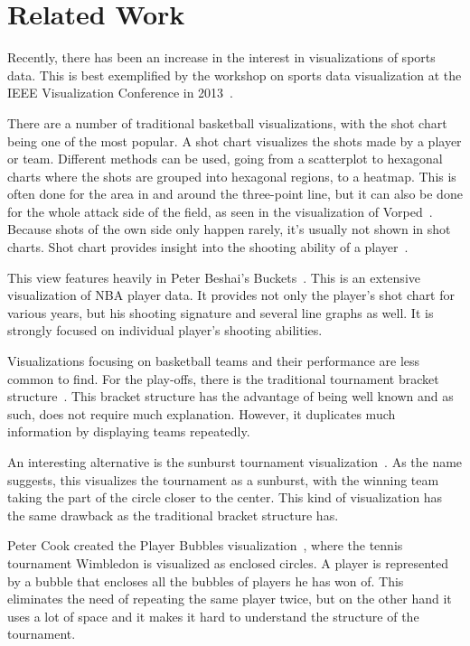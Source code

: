 \documentclass[]{sigchi}
\begin{document}
\section{Related Work}\label{sec:literature}
Recently, there has been an increase in the interest in visualizations of sports
data. This is best exemplified by the workshop on sports data visualization at
the IEEE Visualization Conference in 2013~\cite{ieeevis}. 

There are a number of traditional basketball visualizations, with the shot chart 
being one of the most popular. A shot chart  visualizes the shots made by a player or team. Different methods can be used, going from a scatterplot to hexagonal charts where the shots are grouped into hexagonal regions, to a heatmap. This is often done for the area in and around the three-point line, but it can also be done for the whole attack side of the field, as seen in the visualization of Vorped~\cite{vorped}. Because shots of the own side only happen rarely, it's usually not shown in shot charts. Shot chart provides insight into the shooting ability of a
player~\cite{goldsberry,stephenchu}.

This view features heavily in Peter Beshai's Buckets~\cite{peterbeshai}. This is
an extensive visualization of NBA player data. It provides not only the player's
shot chart for various years, but his shooting signature and several line graphs
as well. It is strongly focused on individual player's shooting abilities. 

Visualizations focusing on basketball teams and their performance are
less common to find. For the play-offs, there is the traditional tournament bracket structure~\cite{tournamentladder}. This bracket structure has the
advantage of being well known and as such, does not require much explanation. 
However, it duplicates much information by displaying teams repeatedly. 

An interesting alternative is the sunburst tournament
visualization~\cite{sunburst}. As the name suggests, this visualizes the
tournament as a sunburst, with the winning team taking the part of the circle
closer to the center. This kind of visualization has the same drawback as the traditional bracket structure has.

Peter Cook created the Player Bubbles visualization~\cite{enclosedcircles}, where the tennis tournament Wimbledon is visualized as enclosed circles. A player is represented by a bubble that encloses all the bubbles of players he has won of. This eliminates the need of repeating the same player twice, but on the other hand it uses a lot of space and it makes it hard to understand the structure of the tournament.
\end{document}
